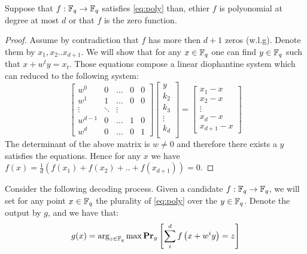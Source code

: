\begin{claim}
  Suppose that $f : \FF \rightarrow \FF$ satisfies \cref{eq:poly} than, ethier $f$ is polyonomial at degree at most $d$ or that $f$ is the zero function.  
\end{claim}
\begin{proof}
  Assume by contradiction that $f$ has more then $d+1$ zeros (w.l.g). Denote them  by $x_{1},x_{2}.. x_{d+1}$. We will show that for any $x \in \FF $ one can find $y \in \FF$ such that $x + w^{t}y =x_{t}$. Those equations compose a linear diophantine system which can reduced to the following system: 
  \begin{equation*}  
\begin{bmatrix}
  w^{0}                     & 0 &  \dots                   &  0 &     0                 \\
                               w^{1}                & 1     &  \dots             & 0      &       0                    \\
                              \vdots                    &  \ddots               &  \vdots                    \\
                               w^{d-1}              & 0    &  \dots             &   1   &       0                    \\
                               w^{d}              & 0 & \dots       &  0     &       1
\end{bmatrix} 
\begin{bmatrix}
  y \\ 
  k_{2} \\
  k_{3} \\
  \vdots  \\
  k_{d} \\  
\end{bmatrix}
= \begin{bmatrix}
  x_{1} - x \\
  x_{2} -x \\
  \vdots \\
  x_{d} - x \\
  x_{d+1} - x
\end{bmatrix}
  \end{equation*}
  The determinant of the above matrix is $w \neq 0$ and therefore there exists a $y$ satisfies the equations. Hence for any $x$ we have $f(x) = \frac{1}{d}\left( f(x_{1}) + f(x_{2}) + .. + f(x_{d+1}) \right) = 0$.   
\end{proof}
Consider the following decoding process. Given a candidate $f : \FF \rightarrow \FF$, we will set for any point $x \in \FF$ the plurality of \cref{eq:poly} over the $y \in \FF$. Denote the output by $g$, and we have that:
\begin{equation*}
  \begin{split}
    g(x) = \arg_{z\in \FF} \max \prbm{ \sum_{i}^{d}{f\left( x + w^{i}y \right) = z }}{y}
  \end{split}
\end{equation*}

